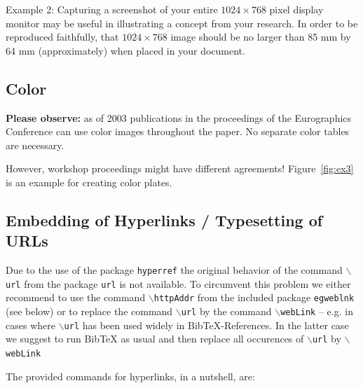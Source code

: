 \documentclass{egpubl}
\begin{document}
Example 2:
%
Capturing a screenshot of your entire $1024 \times 768$ pixel display
monitor may be useful in illustrating a concept from your research. In
order to be reproduced faithfully, that $1024 \times 768$ image should
be no larger than 85 mm by 64 mm (approximately) when placed in your
document.


\subsection{Color}

\textbf{Please observe:} as of 2003 publications in the proceedings of the
Eurographics Conference can use color images throughout the paper. No
separate color tables are necessary.

However, workshop proceedings might have different agreements!
Figure~\ref{fig:ex3} is an example for creating color plates.

\subsection{Embedding of Hyperlinks / Typesetting of URLs}

Due to the use of the package \texttt{hyperref} the original behavior
of the command $\backslash$\texttt{url} from the package \texttt{url}
is not available. To circumvent this problem we either recommend to
use the command $\backslash$\texttt{httpAddr} from the
included package \texttt{egweblnk} (see below) or to replace the
command $\backslash$\texttt{url} by the command $\backslash$\texttt{webLink}
-- e.g. in cases where $\backslash$\texttt{url} has been used
widely in BibTeX-References. In the latter case we suggest to run
BibTeX as usual and then replace all occurences of $\backslash$\texttt{url}  by
$\backslash$\texttt{webLink}

\noindent
The provided commands for hyperlinks, in a nutshell, are:
\end{document}
